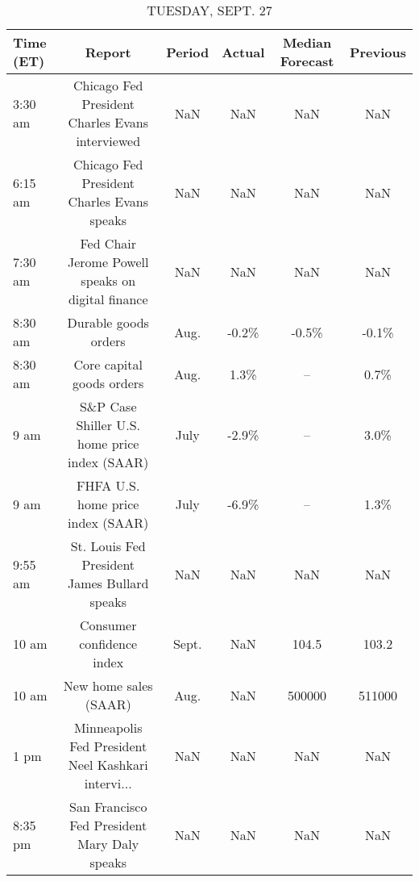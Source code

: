 \documentclass{book}
\begin{document}
  
  \begin{table}[htbp]%
  \caption{TUESDAY, SEPT. 27}%
  \centering%
  \begin{adjustbox}{width=1\textwidth}%
  \begin{tabular}{lccccc}
  \toprule
  Time (ET) &                                             Report & Period & Actual & Median Forecast & Previous \\
  \midrule
    3:30 am &    Chicago Fed President Charles Evans interviewed &    NaN &    NaN &             NaN &      NaN \\
    6:15 am &         Chicago Fed President Charles Evans speaks &    NaN &    NaN &             NaN &      NaN \\
    7:30 am &  Fed Chair Jerome Powell speaks on digital finance &    NaN &    NaN &             NaN &      NaN \\
    8:30 am &                               Durable goods orders &   Aug. &  -0.2\% &           -0.5\% &    -0.1\% \\
    8:30 am &                          Core capital goods orders &   Aug. &   1.3\% &              -- &     0.7\% \\
       9 am &      S\&P Case Shiller U.S. home price index (SAAR) &   July &  -2.9\% &              -- &     3.0\% \\
       9 am &                  FHFA U.S. home price index (SAAR) &   July &  -6.9\% &              -- &     1.3\% \\
    9:55 am &       St. Louis Fed President James Bullard speaks &    NaN &    NaN &             NaN &      NaN \\
      10 am &                          Consumer confidence index &  Sept. &    NaN &           104.5 &    103.2 \\
      10 am &                              New home sales (SAAR) &   Aug. &    NaN &          500000 &   511000 \\
       1 pm & Minneapolis Fed President Neel Kashkari intervi... &    NaN &    NaN &             NaN &      NaN \\
    8:35 pm &       San Francisco Fed President Mary Daly speaks &    NaN &    NaN &             NaN &      NaN \\
  \bottomrule
  \end{tabular}
  \end{adjustbox}%
  \end{table}
  
  
\end{document}

